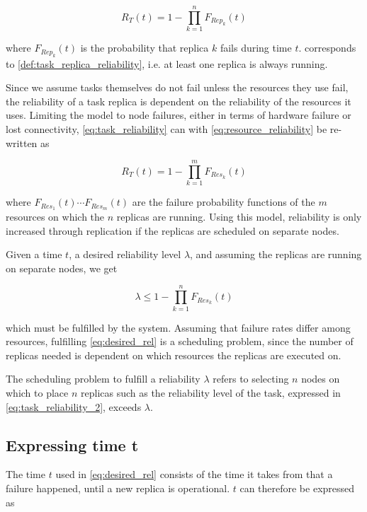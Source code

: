 \documentclass{cslthse-msc}
\begin{document}
\begin{equation} \label{eq:task_reliability}
R_{T}(t) =  1 - \prod\limits_{k=1}^n F_{Rep_k}(t)
\end{equation}

where $F_{Rep_k}(t)$ is the probability that replica $k$ fails during time $t$.  corresponds to \cref{def:task_replica_reliability}, i.e. at least one replica is always running.

Since we assume tasks themselves do not fail unless the resources they use fail, the reliability of a task replica is dependent on the reliability of the resources it uses. Limiting the model to node failures, either in terms of hardware failure or lost connectivity, \cref{eq:task_reliability} can with \cref{eq:resource_reliability} be re-written as

\begin{equation} \label{eq:task_reliability_2}
R_{T}(t) = 1 - \prod\limits_{k=1}^m  F_{Res_k}(t)
\end{equation}

where $F_{Res_1}(t) \cdots F_{Res_m}(t)$ are the failure probability functions of the $m$ resources on which the $n$ replicas are running. Using this model, reliability is only increased through replication if the replicas are scheduled on separate nodes.

Given a time $t$, a desired reliability level $\lambda$, and assuming the replicas are running on separate nodes, we get

\begin{equation} \label{eq:desired_rel}
\lambda \leq 1 - \prod\limits_{k=1}^n  F_{Res_k}(t)
\end{equation}

which must be fulfilled by the system. Assuming that failure rates differ among resources, fulfilling \cref{eq:desired_rel} is a scheduling problem, since the number of replicas needed is dependent on which resources the replicas are executed on.

The scheduling problem to fulfill a reliability $\lambda$ refers to selecting $n$ nodes on which to place $n$ replicas such as the reliability level of the task, expressed in \cref{eq:task_reliability_2}, exceeds $\lambda$.

\subsection{Expressing time t} \label{sec:design_time_t}
The time $t$ used in \cref{eq:desired_rel} consists of the time it takes from that a failure happened, until a new replica is operational. $t$ can therefore be expressed as 
\end{document}
